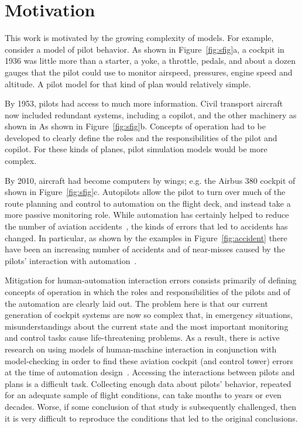 \documentclass[journal]{IEEEtran}
\newcommand{\fig}[1]{Figure~\ref{fig:#1}}
\begin{document}
\section{Motivation}\label{sec:mot}

This work is motivated by the growing complexity of  models. For example, consider a model of pilot behavior.
As shown in \fig{sfig}a, a cockpit in 1936  was little more than a starter, a yoke, a throttle, pedals, and about a dozen gauges that the pilot could use to monitor airspeed, pressures, engine speed and altitude.  
A pilot model for that kind of plan would   relatively simple.

By 1953, pilots had access to much more information.  
Civil transport aircraft now included redundant systems, including a copilot, and the other
machinery as shown in As shown in \fig{sfig}b. 
Concepts of operation had to be developed to clearly define the roles and the responsibilities of the pilot and copilot. 
For these kinds of planes, pilot simulation models would be more complex.
 
By 2010, aircraft had become computers by wings; e.g. the Airbus 380 cockpit of shown in \fig{sfig}c.
Autopilots allow the pilot to turn over much of the route planning and control to automation on the flight deck, and instead take a more passive monitoring role.
While automation has certainly helped to reduce the number of aviation accidents~\cite{Coombs2005}, the kinds of errors that led to accidents has changed.  
In particular, as shown by the examples in \fig{accident} there have been an increasing number of accidents and of near-misses caused by the pilots' interaction with automation~\cite{Billings1991,Sarter1995,Sarter1997}.








Mitigation for human-automation interaction errors consists primarily of defining concepts of operation in which the roles and responsibilities of the pilots and of the automation are clearly laid out.
The problem here is that 
our current generation of cockpit systems are now so complex that, in emergency situations, misunderstandings about the current state and the most important monitoring and control tasks cause life-threatening problems.  
As a result, there is active research on using models of human-machine interaction in conjunction with model-checking in order to find these aviation cockpit (and control tower) errors at the time of automation design~\cite{Bolton2011,Rungta2013,Gelman2014}. 
Accessing the interactions between pilots and plans is a difficult task.  
Collecting enough data about pilots' behavior, repeated for an adequate sample of flight conditions, can take months to years or even decades.  
Worse, if some conclusion of that study is subsequently challenged, then it is very difficult to reproduce the conditions that led to the original conclusions.
\end{document}
